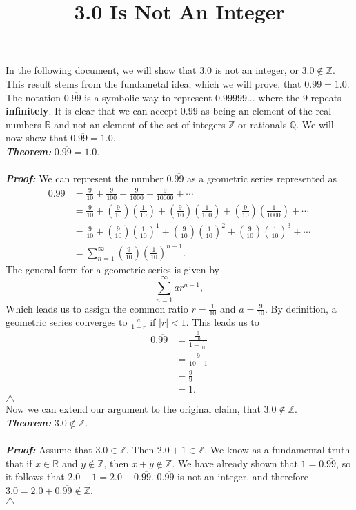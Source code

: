 \documentclass{article}
\title{3.0 Is Not An Integer}
\date{}
\newcommand{\ZZ}{\mathbb{Z}}
\newcommand{\RR}{\mathbb{R}}
\newcommand{\QQ}{\mathbb{Q}}
\begin{document}
\maketitle
\newpage

In the following document, we will show that 3.0 is not an integer, or $3.0 \notin \ZZ$. This result
stems from the fundametal idea, which we will prove, that $0.\overline{99} = 1.0$. The notation
$0.\overline{99}$ is a symbolic way to represent $0.99999...$ where the $9$ repeats \textbf{infinitely}.
It is clear that we can accept $0.\overline{99}$ as being an element of the real numbers $\RR$ and not an
element of the set of integers $\ZZ$ or rationals $\QQ$. We will now show that $0.\overline{99} = 1.0$.\\

\noindent\textbf{\textit{Theorem:}} $0.\overline{99} = 1.0$.\\\\
\indent\textbf{\textit{Proof:}} We can represent the number $0.\overline{99}$ as a geometric series
represented as
\begin{align*}
0.\overline{99} &= \frac{9}{10} + \frac{9}{100} + \frac{9}{1000} + \frac{9}{10000} + \cdots\\
&= \frac{9}{10} + \left(\frac{9}{10}\right)\left(\frac{1}{10}\right) +
\left(\frac{9}{10}\right)\left(\frac{1}{100}\right) +
\left(\frac{9}{10}\right)\left(\frac{1}{1000}\right) + \cdots\\
&= \frac{9}{10} + \left(\frac{9}{10}\right)\left(\frac{1}{10}\right)^{1} +
\left(\frac{9}{10}\right)\left(\frac{1}{10}\right)^{2} +
\left(\frac{9}{10}\right)\left(\frac{1}{10}\right)^{3} + \cdots\\
&= \sum_{n=1}^{\infty}\left(\frac{9}{10}\right)\left(\frac{1}{10}\right)^{n-1}.
\end{align*}
The general form for a geometric series is given by
\[
\sum_{n=1}^{\infty}ar^{n-1},
\]
Which leads us to assign the common ratio $r = \frac{1}{10}$ and $a = \frac{9}{10}$. By definition,
a geometric series converges to $\frac{a}{1 - r}$ if $|r| < 1$. This leads us to
\begin{align*}
0.\overline{99} &= \frac{\frac{9}{10}}{1 - \frac{1}{10}}\\
&= \frac{9}{10 -1}\\
&= \frac{9}{9}\\
&= 1.
\end{align*}
$\triangle$
\noindent\\

Now we can extend our argument to the original claim, that $3.0\notin\ZZ$.\\
\noindent\textbf{\textit{Theorem:}} $3.0\notin\ZZ$.\\\\
\indent\textbf{\textit{Proof:}} Assume that $3.0\in\ZZ$. Then $2.0 + 1 \in\ZZ$. We know as a fundamental
truth that if $x\in\RR$ and $y\notin\ZZ$, then $x + y\notin\ZZ$. We have already shown that
$1 = 0.\overline{99}$, so it follows that $2.0 + 1 = 2.0 + 0.\overline{99}$. $0.\overline{99}$ is not an
integer, and therefore $3.0 = 2.0 + 0.\overline{99}\notin\ZZ$.\\
$\triangle$
\newpage
\end{document}
